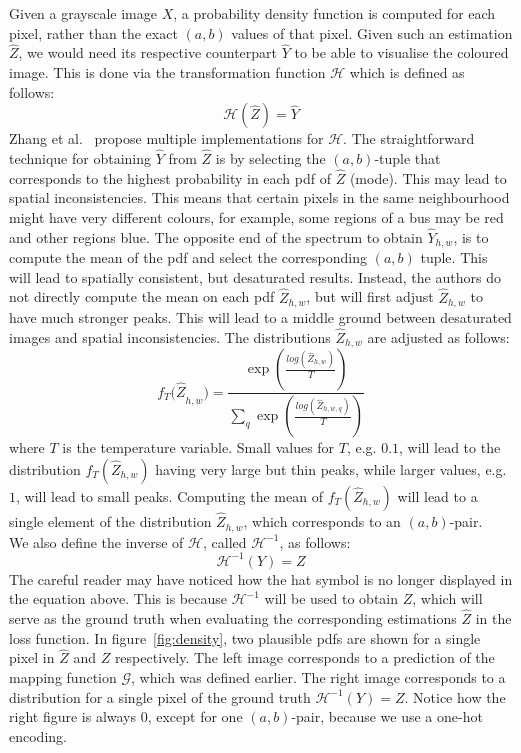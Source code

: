 \documentclass{article}
\begin{document}
Given a grayscale image $X$, a probability density function is computed for each pixel, rather than the exact $\left(a,b\right)$ values of that pixel. Given such an estimation $\hat{Z}$, we would need its respective counterpart $\hat{Y}$ to be able to visualise the coloured image. This is done via the transformation function $\mathcal{H}$ which is defined as follows:
\[\mathcal{H}\left(\hat{Z}\right)=\hat{Y}\]
Zhang et al.~\cite{colourful} propose multiple implementations for $\mathcal{H}$. The straightforward technique for obtaining $\hat{Y}$ from $\hat{Z}$ is by selecting the $(a, b)$-tuple that corresponds to the highest probability in each pdf of $\hat{Z}$ (mode). This may lead to spatial inconsistencies. This means that certain pixels in the same neighbourhood might have very different colours, for example, some regions of a bus may be red and other regions blue. The opposite end of the spectrum to obtain ${\hat{Y}}_{h,w}$, is to compute the mean of the pdf and select the corresponding $(a, b)$ tuple. This will lead to spatially consistent, but desaturated results. Instead, the authors do not directly compute the mean on each pdf ${\hat{Z}}_{h,w}$, but will first adjust ${\hat{Z}}_{h,w}$ to have much stronger peaks. This will lead to a middle ground between desaturated images and spatial inconsistencies. The distributions ${\hat{Z}}_{h,w}$ are adjusted as follows:
\[{f_T(\hat{Z}}_{h,w})=\frac{\exp\left(\tfrac{log\left({\hat{Z}}_{h,w}\right)}{T}\right)}{\sum_q\exp\left(\tfrac{log\left({\hat{Z}}_{h,w,q}\right)}{T}\right)}\]
where $T$ is the temperature variable. Small values for $T$, e.g. $0.1$, will lead to the distribution $f_T(\hat{Z}_{h,w})$ having very large but thin peaks, while larger values, e.g. $1$, will lead to small peaks. Computing the mean of $f_T(\hat{Z}_{h,w})$ will lead to a single element of the distribution $\hat{Z}_{h,w}$, which corresponds to an $(a, b)$-pair.\\
We also define the inverse of $\mathcal{H}$, called $\mathcal{H}^{-1}$, as follows:
\[\mathcal{H}^{-1}\left(Y\right)=Z\]
The careful reader may have noticed how the hat symbol is no longer displayed in the equation above. This is because $\mathcal{H}^{-1}$ will be used to obtain $Z$, which will serve as the ground truth when evaluating the corresponding estimations $\hat{Z}$ in the loss function. In figure~\ref{fig:density}, two plausible pdfs are shown for a single pixel in $\hat{Z}$ and $Z$ respectively. The left image corresponds to a prediction of the mapping function $\mathcal{G}$, which was defined earlier. The right image corresponds to a distribution for a single pixel of the ground truth $\mathcal{H}^{-1}\left(Y\right)=Z$. Notice how the right figure is always $0$, except for one $(a, b)$-pair, because we use a one-hot encoding.
\end{document}
